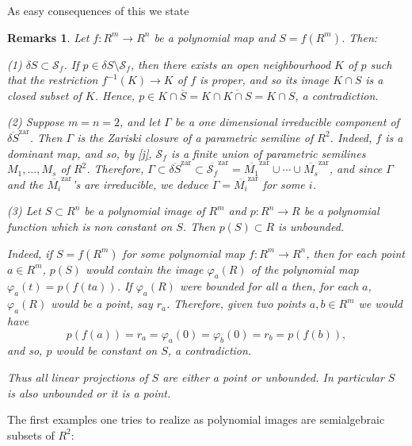 \documentclass[11pt,draft]{article}
\newtheorem{sremarks}[thm]{Remarks}
\newcommand{\Zar}{\operatorname{zar}}
\newcommand{\ol}{\overline}
\begin{document}
As easy consequences of this we state
\begin{sremarks}\label{proj}
\em 
Let $f:R^m\rightarrow R^n$ be a polynomial map and $S=f(R^m)$. Then:

\em (1) \em $\delta S\subset{\mathcal S}_f$.  If $p\in\delta S\setminus {\mathcal S}_f$,
then there exists an open neighbourhood $K$ of $p$ such that the restriction 
$f^{-1}(K)\rightarrow K$ of $f$ is proper, and so its image $K\cap S$ is a closed subset of
$K$. Hence, $p\in K\cap \ol S=K\cap\ol{K\cap S}=K\cap S$, a contradiction.

\em (2) \em Suppose $m=n=2$, and let $\Gamma$ be a one dimensional irreducible component of
$\ol{\delta S}^{\Zar}$. Then $\Gamma$ is the Zariski closure of a parametric semiline of
$R^2$. Indeed, $f$ is a dominant map, and so, by \ref{j}, ${\mathcal S}_f$
is a finite union of parametric semilines $M_1,\ldots,M_s$ of $R^2$. Therefore,
$\Gamma\subset \ol{\delta S}^{\Zar}\subset\ol{{\mathcal S}_f}^{\Zar}=
\ol{M_1}^{\Zar}\cup\cdots\cup\ol{M_s}^{\Zar}$, and since $\Gamma$ and the
$\ol{M_i}^{\Zar}$'s are irreducible, we deduce $\Gamma=\ol{M_i}^{\Zar}$ for some $i$.

\em (3) \em Let $S\subset R^n$ be a polynomial image of $R^m$ and $p:R^n\rightarrow R$ be a
polynomial function which is non constant on $S$. Then $p(S)\subset R$ is unbounded. 

Indeed, if $S=f(R^m)$ for some polynomial map $f:R^m\rightarrow R^n$, then for each point
$a\in R^m$, $p(S)$ would contain the image $\varphi_a(R)$ of the polynomial map
$\varphi_a(t)=p(f(ta))$. If $\varphi_a(R)$ were bounded for all $a$ then, for each $a$,
$\varphi_a(R)$ would be a point, say $r_a$. Therefore, given two points $a,b\in R^m$ we
would have
$$ 
p(f(a))=r_a=\varphi_a(0)=\varphi_b(0)=r_b=p(f(b)),
$$
and so, $p$ would be constant on $S$, a contradiction.

Thus all linear projections of $S$ are either a point or unbounded. In particular $S$ is
also unbounded or it is a point.
\em
\end{sremarks}

The first examples one tries to realize as polynomial images are semialgebraic subsets of
$R^2$: 
\end{document}
